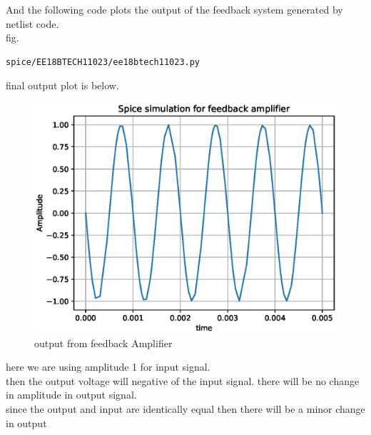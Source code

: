 \begin{enumerate}[label=\thesection.\arabic*.,ref=\thesection.\theenumi]
And the following code plots the output of the feedback system generated by netlist code.\\
fig.
 \begin{lstlisting}
spice/EE18BTECH11023/ee18btech11023.py
\end{lstlisting}
final output plot is below.
\begin{figure}[!h]
    \centering
    \includegraphics[width=\columnwidth]{figs/EE18BTECH11023/ee18btech11023_output.eps}
    \caption{output from feedback Amplifier}
    \label{fig:output}
\end{figure}
here we are using amplitude 1 for input signal. \\
then the output voltage will negative of the input signal. there will be no change in amplitude in output signal.\\

since the output and input are identically equal then there will be a minor change in output
\end{enumerate}
